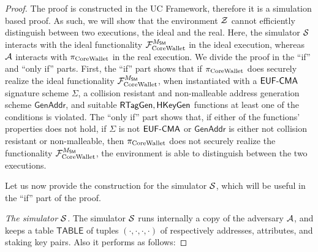 \begin{proof}
    The proof is constructed in the UC Framework, therefore it is a simulation
    based proof. As such, we will show that the environment $\mathcal{Z}$ cannot
    efficiently distinguish between two executions, the ideal and the real.
    Here, the simulator $\mathcal{S}$ interacts with the ideal functionality
    $\mathcal{F}_\mathrm{CoreWallet}^{M_{\mathsf{SM}}}$ in the ideal execution, whereas $\mathcal{A}$ interacts
    with $\pi_\mathrm{CoreWallet}$ in the real execution.
    We divide the proof in the ``if'' and ``only
    if'' parts. First, the ``if'' part shows that if $\pi_\mathrm{CoreWallet}$ does securely
    realize the ideal functionality $\mathcal{F}_\mathrm{CoreWallet}^{M_{\mathsf{SM}}}$, when
    instantiated with a $\textsf{EUF-CMA}$ signature scheme $\Sigma$, a collision
    resistant and non-malleable address generation scheme $\mathsf{GenAddr}$,
    and suitable $\mathsf{RTagGen}, \mathsf{HKeyGen}$ functions at
    least one of the conditions is violated. The ``only if'' part shows that,
    if either of the functions' properties does not hold, \eg if $\Sigma$ is
    not $\textsf{EUF-CMA}$ or $\mathsf{GenAddr}$ is either not collision resistant or
    non-malleable, then $\pi_\mathrm{CoreWallet}$ does not securely realize the functionality
    $\mathcal{F}_\mathrm{CoreWallet}^{M_{\mathsf{SM}}}$, \ie the environment is able to distinguish
    between the two executions.

    Let us now provide the construction for the simulator $\mathcal{S}$, which will
    be useful in the ``if'' part of the proof.

    \emph{The simulator $\mathcal{S}$.}
    The simulator $\mathcal{S}$ runs internally a copy of the adversary $\mathcal{A}$, and
    keeps a table $\mathsf{TABLE}$ of tuples $(\cdot,\cdot,\cdot,\cdot)$ of
    respectively addresses, attributes, and staking key pairs. Also it performs
    as follows:


\end{proof}
